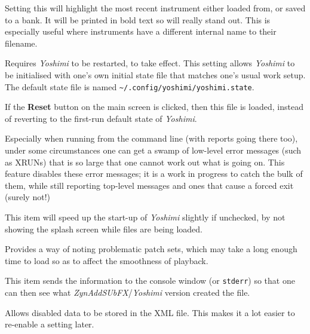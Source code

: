    \setcounter{ItemCounter}{0}      %
   Setting this will highlight the most recent instrument either loaded from, or saved to a bank. It will be printed in bold text so will really stand out. This is especially useful where instruments have a different internal name to their filename.

   Requires \textsl{Yoshimi} to be restarted, to take effect.
   This setting allows \textsl{Yoshimi} to be initialised with one's own
   initial state file that matches one's usual work setup.
   The default state file is named
   \texttt{\textasciitilde/.config/yoshimi/yoshimi.state}.

   If the \textbf{Reset} button on the main screen is clicked, then this file
   is loaded, instead of reverting to the first-run default state of
   \textsl{Yoshimi}.

   Especially when running from the command line (with reports going there
   too), under some circumstances one can get a swamp of low-level error
   messages (such as XRUNs) that is so large that one cannot work out what is
   going on. This feature disables these error messages; it is a work in
   progress to catch the bulk of them, while still reporting top-level messages
   and ones that cause a forced exit (surely not!)

   This item will speed up the start-up of \textsl{Yoshimi} slightly
   if unchecked, by not showing the splash screen while files are being loaded.

   Provides a way of noting problematic patch sets, which may take a long
   enough time to load so as to affect the smoothness of playback.

   This item sends the information to the console window
   (or \texttt{stderr}) so that
   one can then see what \textsl{ZynAddSUbFX}/\textsl{Yoshimi}
   version created the file.

   Allows disabled data to be stored in the XML file.
   This makes it a lot easier to re-enable a setting later.


